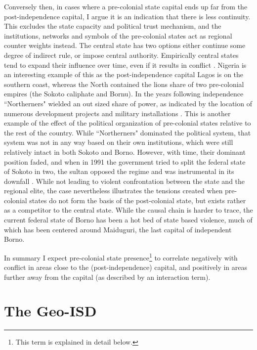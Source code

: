 \documentclass[12pt]{article}
\begin{document}
Conversely then, in cases where a pre-colonial state capital ends up far from
the post-independence capital, I argue it is an indication that there is less
continuity. This excludes the state capacity and political trust mechanism, and
the institutions, networks and symbols of the pre-colonial states act as
regional counter weights instead. The central state has two options either
continue some degree of indirect rule, or impose central authority. Empirically
central states tend to expand their influence over time, even if it results in
conflict \citep{Ying_2020}. Nigeria is an interesting example of this as the
post-independence capital Lagos is on the southern coast, whereas the North
contained the lions share of two pre-colonial empires (the Sokoto caliphate and
Bornu). In the years following independence ``Northerners" wielded an out sized
share of power, as indicated by the location of numerous development projects
and military installations \citep{Bates2008a}. This is another example of the
effect of the political organization of pre-colonial states relative to the rest
of the country. While ``Northerners" dominated the political system, that system
was not in any way based on their own institutions, which were still relatively
intact in both Sokoto and Borno. However, with time, their dominant position
faded, and when in 1991 the government tried to split the federal state of
Sokoto in two, the sultan opposed the regime and was instrumental in its
downfall \citep{HiribarrenVincent2017AHoB}. While not leading to violent
confrontation between the state and the regional elite, the case nevertheless
illustrates the tensions created when pre-colonial states do not form the basis
of the post-colonial state, but exists rather as a competitor to the central
state. While the causal chain is harder to trace, the current federal state of
Borno has been a hot bed of state based violence, much of which has been
centered around Maiduguri, the last capital of independent Borno.

In summary I expect pre-colonial state presence\footnote{This term is explained
in detail below.} to correlate negatively with conflict in areas close to the
(post-independence) capital, and positively in areas further away from the
capital (as described by an interaction term).

\section{The Geo-ISD}
\end{document}
